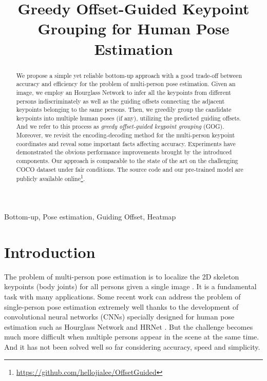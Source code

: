 \documentclass{article}
\title{G\lowercase{reedy} O\lowercase{ffset}-G\lowercase{uided} K\lowercase{eypoint} G\lowercase{rouping} \lowercase{for} H\lowercase{uman} P\lowercase{ose} E\lowercase{stimation}}
\begin{document}
\maketitle
\begin{abstract}
We propose a simple yet reliable bottom-up approach with a good trade-off between accuracy and efficiency for the problem of multi-person pose estimation.  Given an image, we employ an Hourglass Network to infer all the keypoints from different persons indiscriminately as well as the guiding offsets connecting the adjacent keypoints belonging to the same persons. Then, we greedily group the candidate keypoints into multiple human poses (if any), utilizing the predicted guiding offsets. And we refer to this process as \textit{greedy offset-guided keypoint grouping} (GOG). Moreover, we revisit the encoding-decoding method for the multi-person keypoint coordinates and reveal some important facts affecting accuracy. 
Experiments have demonstrated the obvious performance improvements brought by the introduced components. Our approach is comparable to the state of the art on the challenging COCO dataset under fair conditions.  The source code and our pre-trained model are publicly available online\footnote{\textcolor{magenta}{\url{https://github.com/hellojialee/OffsetGuided}}}. 


\end{abstract}
\begin{keywords}
Bottom-up, Pose estimation, Guiding Offset, Heatmap 
\end{keywords}
\section{Introduction}
\label{sec:intro}

The problem of multi-person pose estimation is to localize the 2D skeleton keypoints (body joints) for all persons given a single image  \cite{Ronchi2017Benchmarking, Papandreou2018PersonLab, li2020simple}. It is a fundamental task with many applications.
Some recent work can address the problem of single-person pose estimation extremely well thanks to the development of  convolutional neural networks (CNNs) specially designed for human pose estimation such as Hourglass Network \cite{Newell2016Stacked, law2018cornernet, li2020simple} and HRNet \cite{sun2019deep}. But the challenge becomes much more difficult when multiple persons appear in the scene at the same time. And it has not been solved well so far considering accuracy, speed and simplicity.
\end{document}
